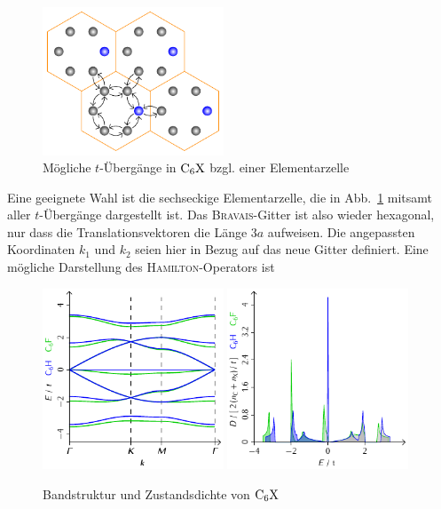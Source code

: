 \documentclass[a4paper, 10pt, twoside, openany]{book} %
\begin{document}
	\begin{figure}
		\centering
		\includegraphics[width=0.48\textwidth]{Abbildungen/Raumstrukturen/Sechstel.pdf}
		\caption{Mögliche $t$-Übergänge in $\rm C_6X$ bzgl. einer Elementarzelle}
		\label{Uebergaenge C6X}
	\end{figure}
	Eine geeignete Wahl ist die sechseckige Elementarzelle, die in Abb.~\ref{Uebergaenge C6X} mitsamt aller $t$-Übergänge dargestellt ist. Das \textsc{Bravais}-Gitter ist also wieder hexagonal, nur dass die Translationsvektoren die Länge $3 a$ aufweisen. Die angepassten Koordinaten $k_1$ und $k_2$ seien hier in Bezug auf das neue Gitter definiert. Eine mögliche Darstellung des \textsc{Hamilton}-Operators ist
	\begin{figure}
		\includegraphics[width=0.48\textwidth]{Abbildungen/Bandstrukturen/C6X.pdf}
		\hfill
		\includegraphics[width=0.48\textwidth]{Abbildungen/Bandstrukturen/DOS_C6X.pdf}
		\caption{Bandstruktur und Zustandsdichte von $\rm C_6X$}
		\label{C6X}
	\end{figure}
\end{document}

